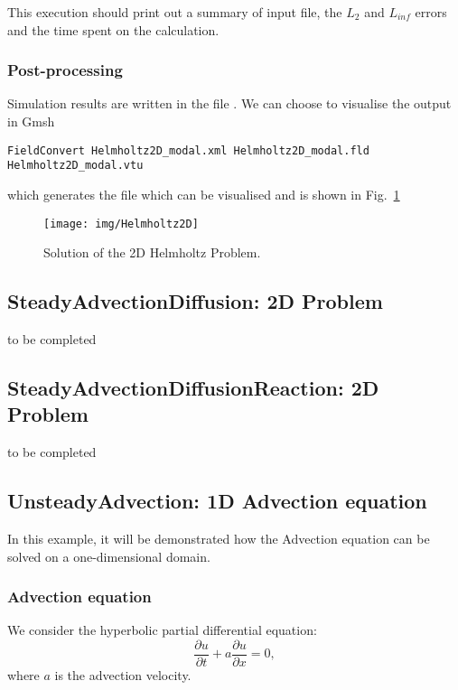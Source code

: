 This execution should print out a summary of input file, the $L_2$ and
$L_{inf}$ errors and the time spent on the calculation.

\subsubsection{Post-processing}
Simulation results are written in the file . We can choose
to visualise the output in Gmsh
\begin{lstlisting}[style=BashInputStyle]
FieldConvert Helmholtz2D_modal.xml Helmholtz2D_modal.fld Helmholtz2D_modal.vtu
\end{lstlisting}
which generates the file  which can be visualised and is
shown in Fig.~\ref{f:adrsolver:helmholtz2D}

\begin{figure}
\begin{center}
\texttt{[image: img/Helmholtz2D]}
\caption{Solution of the 2D Helmholtz Problem.}
\label{f:adrsolver:helmholtz2D}
\end{center}
\end{figure}


\subsection{SteadyAdvectionDiffusion: 2D Problem}
to be completed


\subsection{SteadyAdvectionDiffusionReaction: 2D Problem}
to be completed


\subsection{UnsteadyAdvection: 1D Advection equation}

In this example, it will be demonstrated how the Advection equation can be
solved on a one-dimensional domain.

\subsubsection{Advection equation}
We consider the hyperbolic partial differential equation:
\begin{equation}
\dfrac{\partial u}{\partial t} + a\dfrac{\partial u}{\partial x} = 0,
\end{equation}
where $a$ is the advection velocity.

